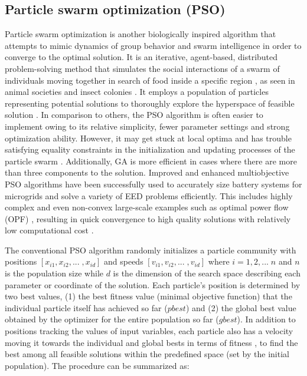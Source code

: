 \documentclass[final,3p,times]{elsarticle}
\begin{document}
\subsection{Particle swarm optimization (PSO) \label{app:pso}}

Particle swarm optimization is another biologically inspired algorithm that attempts to mimic dynamics of group behavior and swarm intelligence in order to converge to the optimal solution. It is an iterative, agent-based, distributed problem-solving method that simulates the social interactions of a swarm of individuals moving together in search of food inside a specific region \cite{fathima2015}, as seen in animal societies and insect colonies \cite{pathak2017}. It employs a population of particles representing potential solutions to thoroughly explore the hyperspace of feasible solution \cite{alrashidi2010}. In comparison to others, the PSO algorithm is often easier to implement owing to its relative simplicity, fewer parameter settings and strong optimization ability. However, it may get stuck at local optima and has trouble satisfying equality constraints in the initialization and updating processes of the particle swarm \cite{wu2014}. Additionally, GA is more efficient in cases where there are more than three components to the solution. Improved and enhanced multiobjective PSO algorithms have been successfully used to accurately size battery systems for microgrids and solve a variety of EED problems efficiently. This includes highly complex and even non-convex large-scale examples such as optimal power flow (OPF) \cite{alrashidi2010}, resulting in quick convergence to high quality solutions with relatively low computational cost \cite{pathak2017}.

The conventional PSO algorithm randomly initializes a particle community with positions $[x_{i1}, x_{i2}, ... \; , x_{id}]$ and speeds $[v_{i1}, v_{i2}, ... \;, v_{id}]$ where $i = 1,2,... \; n$ and $n$ is the population size while $d$ is the dimension of the search space describing each parameter or coordinate of the solution. Each particle's position is determined by two best values, (1) the best fitness value (minimal objective function) that the individual particle itself has achieved so far ($pbest$) and (2) the global best value obtained by the optimizer for the entire population so far ($gbest$). In addition to positions tracking the values of input variables, each particle also has a velocity moving it towards the individual and global bests in terms of fitness \cite{borhanazad2014}, to find the best among all feasible solutions within the predefined space (set by the initial population). The procedure can be summarized as:
\end{document}
